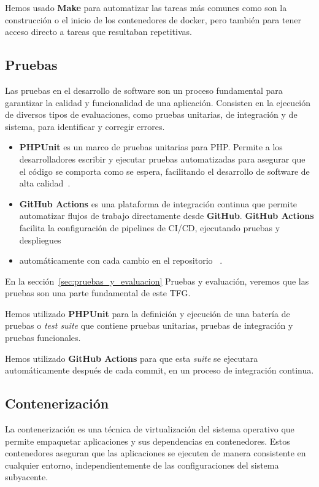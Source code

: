 Hemos usado \textbf{Make} para automatizar las tareas más comunes como son la construcción o el inicio de los
contenedores de docker, pero también para tener acceso directo a tareas que resultaban repetitivas.

\subsection{Pruebas}

Las pruebas en el desarrollo de software son un proceso fundamental para garantizar la calidad y funcionalidad de una
aplicación.
Consisten en la ejecución de diversos tipos de evaluaciones, como pruebas unitarias, de integración y de sistema, para
identificar y corregir errores.

\begin{itemize}
    \item \textbf{PHPUnit} es un marco de pruebas unitarias para PHP. Permite a los desarrolladores escribir y
    ejecutar pruebas automatizadas para asegurar que el código se comporta como se espera, facilitando el desarrollo de
    software de alta calidad~\cite{url_phpunit}.
    \item \textbf{GitHub Actions} es una plataforma de integración continua que permite automatizar flujos de
    trabajo directamente desde \textbf{GitHub}.
    \textbf{GitHub Actions} facilita la configuración de pipelines de CI/CD, ejecutando pruebas y despliegues
    \item automáticamente con cada cambio en el repositorio ~\cite{url_github_actions}.
\end{itemize}

En la sección~\ref{sec:pruebas_y_evaluacion} Pruebas y evaluación, veremos que las pruebas son una parte fundamental
de este TFG.

Hemos utilizado \textbf{PHPUnit} para la definición y ejecución de una batería de pruebas o \textit{test suite} que
contiene pruebas unitarias, pruebas de integración y pruebas funcionales.

Hemos utilizado \textbf{GitHub Actions} para que esta \textit{suite} se ejecutara automáticamente después de cada
commit, en un proceso de integración continua.

\subsection{Contenerización}

La contenerización es una técnica de virtualización del sistema operativo que permite empaquetar aplicaciones y
sus dependencias en contenedores.
Estos contenedores aseguran que las aplicaciones se ejecuten de manera consistente en cualquier entorno,
independientemente de las configuraciones del sistema subyacente.


